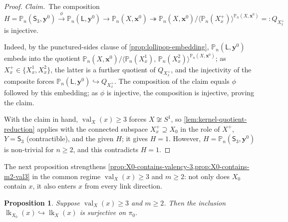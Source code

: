 \documentclass[reqno]{amsart}
\newtheorem{proposition}[theorem]{Proposition}
\theoremstyle{definition}
\newcommand\bfx{\mathbf{x}}
\newcommand\bfy{\mathbf{y}}
\newcommand\sfS{\mathsf{S}}
\newcommand{\PB}{\mathbb{P}}
\newcommand{\co}[1]{\mathopen{\langle}#1\mathclose{\rangle}} %
\newcommand{\base}{\bfx^0}
\newcommand{\Lollipop}{\mathsf{L}}
\DeclareMathOperator{\lk}{lk}
\DeclareMathOperator{\val}{val}
\numberwithin{equation}{section}
\begin{document}
\begin{proof}
\noindent\emph{Claim.}\ The composition
\[
H=\PB_n(\sfS_3,\bfy^0)\xrightarrow{\phi}
\PB_n(\Lollipop,\bfy^0)\longrightarrow
\PB_n(X,\base)\twoheadrightarrow
\PB_n(X,\base)\big/\co{\PB_n(X^+_x)}^{\PB_n(X,\base)}
=: Q_{X^+_x}
\]
is injective.

\smallskip
Indeed, by the punctured-sides clause of
\cref{prop:lollipop-embedding}, \(\PB_n(\Lollipop,\bfy^0)\) embeds
into the quotient
\(\PB_n(X,\base)/\co{\PB_n(X^1_x),\,\PB_n(X^2_x)}^{\PB_n(X,\base)}\);
as \(X^+_x\in\{X^1_x,X^2_x\}\), the latter is a further quotient
of \(Q_{X^+_x}\), and the injectivity of the composite forces
\(\PB_n(\Lollipop,\bfy^0)\hookrightarrow Q_{X^+_x}\). The
composition of the claim equals \(\phi\) followed by this
embedding; as \(\phi\) is injective, the composition is
injective, proving the claim.

\smallskip
With the claim in hand, \(\val_X(x)\geq 3\) forces \(X\not\cong S^1\),
so \cref{lem:kernel-quotient-reduction} applies with the connected
subspace \(X^+_x\supseteq X_0\) in the role of \(X^+\),
\(Y=\sfS_3\) (contractible), and the given \(H\); it gives
\(H=1\).
However, \(H=\PB_n(\sfS_3,\bfy^0)\) is non-trivial for
\(n\geq 2\), and
this contradicts
\(H=1\).
\end{proof}


The next proposition strengthens
\cref{prop:X0-contains-valency-3,prop:X0-contains-m2-val3} in the common regime
\(\val_X(x)\geq 3\) and \(m\geq 2\): not only does \(X_0\) contain \(x\), it
also enters \(x\) from every link direction.

\begin{proposition}\label{prop:X0-meets-link-components}
Suppose \(\val_X(x)\geq 3\) and \(m\geq 2\). Then 
the inclusion \(\lk_{X_0}(x)\hookrightarrow\lk_X(x)\) is surjective on
\(\pi_0\).
\end{proposition}
\end{document}
